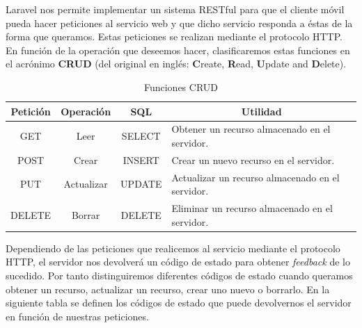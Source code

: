 Laravel nos permite implementar un sistema RESTful para que el cliente móvil pueda hacer peticiones al servicio web y que dicho servicio responda a éstas de la forma que queramos. Estas peticiones se realizan mediante el protocolo HTTP. En función de la operación que deseemos hacer, clasificaremos estas funciones en el acrónimo \textbf{CRUD} \cite{ref:CRUD} (del original en inglés: \textbf{C}reate, \textbf{R}ead, \textbf{U}pdate and \textbf{D}elete).

\begin{table}[H]
\begin{tabular}{|c|c|c|m{6.25cm}|}
\hline
{\bf Petición} & {\bf Operación} & {\bf SQL} & \multicolumn{1}{c|}{{\bf Utilidad}}              \\ \hline
GET            & Leer            & SELECT    & Obtener un recurso almacenado en el servidor.    \\ \hline
POST           & Crear           & INSERT    & Crear un nuevo recurso en el servidor.           \\ \hline
PUT            & Actualizar      & UPDATE    & Actualizar un recurso almacenado en el servidor. \\ \hline
DELETE         & Borrar          & DELETE    & Eliminar un recurso almacenado en el servidor.   \\ \hline
\end{tabular}
\caption{Funciones CRUD}
\label{fig:CRUDtable}
\end{table}

Dependiendo de las peticiones que realicemos al servicio mediante el protocolo HTTP, el servidor nos devolverá un código de estado para obtener \textit{feedback} de lo sucedido. Por tanto distinguiremos diferentes códigos de estado cuando queramos obtener un recurso, actualizar un recurso, crear uno nuevo o borrarlo. En la siguiente tabla se definen los códigos de estado que puede devolvernos el servidor en función de nuestras peticiones.

